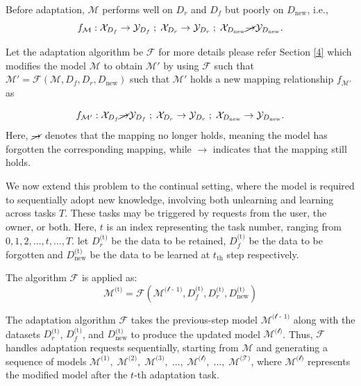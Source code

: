 Before adaptation, $\mathcal{M}$ performs well on $D_r$ and $D_f$ but poorly on $D_{\text{new}}$, i.e.,
{\small
\begin{equation}
f_{\mathcal{M}} :
\mathcal{X}_{D_f} \rightarrow \mathcal{Y}_{D_f} \; ; \;
\mathcal{X}_{D_r} \rightarrow \mathcal{Y}_{D_r} \; ; \;
\mathcal{X}_{D_{\text{new}}} \cancel{\rightarrow} \mathcal{Y}_{D_{\text{new}}}.
\label{eq:1}
\end{equation}
}

Let the adaptation algorithm be $\mathcal{F}$ for more details please refer Section \ref{4} which modifies the model $\mathcal{M}$ to obtain $\mathcal{M'}$ by using $\mathcal{F}$ such that $\mathcal{M}' = \mathcal{F}(\mathcal{M}, D_f, D_r, D_{\text{new}})$ such that $\mathcal{M'}$ holds a new mapping relationship $f_{\mathcal{M}'}$ as 

{\small
\begin{equation}
f_{\mathcal{M'}} :
\mathcal{X}_{D_f} \cancel{\rightarrow} \mathcal{Y}_{D_f} \; ; \;
\mathcal{X}_{D_r} \rightarrow \mathcal{Y}_{D_r} \; ; \;
\mathcal{X}_{D_{\text{new}}} \rightarrow \mathcal{Y}_{D_{\text{new}}}.
\label{eq:2}
\end{equation}
}
Here, \( \cancel{\rightarrow} \) denotes that the mapping no longer holds, meaning the model has forgotten the corresponding mapping, while \( \rightarrow \) indicates that the mapping still holds.

We now extend this problem to the continual setting, where the model is required to sequentially adopt new knowledge, involving both unlearning and learning across tasks $T$. These tasks may be triggered by requests from the user, the owner, or both. Here, $t$ is an index representing the task number, ranging from $0, 1, 2, \ldots, t, \ldots, T$. let $D_r^\text{(t)}$ be the data to be retained, $D_{f}^\text{(t)}$ be the data to be forgotten and $D_\text{new}^\text{(t)}$ be the data to be learned at $t_\text{th}$ step respectively.

The algorithm $\mathcal{F}$ is applied as:
\[
    \mathcal{M}^\text{(t)} = \mathcal{F}(\mathcal{M^\text{{(t - 1)}}}, D_{f}^\text{(t)}, D_{r}^\text{(t)}, D_{\text{new}}^\text{(t)})
\]

The adaptation algorithm $\mathcal{F}$ takes the previous-step model $\mathcal{M^\text{{(t - 1})}}$ along with the datasets 
$D_{r}^\text{(t)}$, $D_{f}^\text{(t)}$, and $D_{\text{new}}^\text{(t)}$ to produce the updated model $\mathcal{M^\text{(t)}}$. Thus, $\mathcal{F}$ handles adaptation requests sequentially, starting from $\mathcal{M}$ and generating  a sequence of models $\mathcal{M^\text{(1)}}, \; \mathcal{M^\text{(2)}}, \; \mathcal{M^\text{(3)}}, \; \ldots, \; \mathcal{M^\text{(t)}}, \; \ldots, \; \mathcal{M^\text{(T)}}$,  where $\mathcal{M^\text{(t)}}$ represents the modified model after the $t$-th adaptation task.

